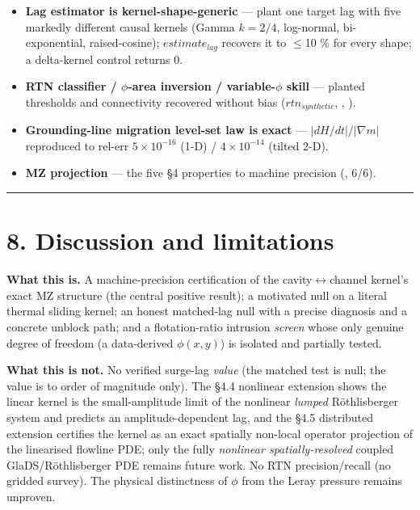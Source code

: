 \documentclass[11pt]{article}
\begin{document}
\begin{itemize}
\item \textbf{Lag estimator is kernel-shape-generic} — plant one target lag with five markedly different causal kernels (Gamma $k=2/4$, log-normal, bi-exponential, raised-cosine); $estimate_{lag}$ recovers it to \ensuremath{\le}10 \% for every shape; a delta-kernel control returns 0.
\item \textbf{RTN classifier / $\phi $-area inversion / variable-$\phi $ skill} — planted thresholds and connectivity recovered without bias ($rtn_{synthetic}$, , ).
\item \textbf{Grounding-line migration level-set law is exact} — $|dH/dt|/|\nabla m|$ reproduced to rel-err $5\times 10^{-16}$ (1-D) / $4\times 10^{-14}$ (tilted 2-D).
\item \textbf{MZ projection} — the five §4 properties to machine precision (, 6/6).
\end{itemize}


\medskip\hrule\medskip


\section*{8. Discussion and limitations}


\textbf{What this is.} A machine-precision certification of the cavity\ensuremath{\leftrightarrow}channel kernel's exact MZ structure (the central positive result); a motivated null on a literal thermal sliding kernel; an honest matched-lag null with a precise diagnosis and a concrete unblock path; and a flotation-ratio intrusion \emph{screen} whose only genuine degree of freedom (a data-derived $\phi (x,y)$) is isolated and partially tested.


\textbf{What this is not.} No verified surge-lag \emph{value} (the matched test is null; the value is to order of magnitude only). The §4.4 nonlinear extension shows the linear kernel is the small-amplitude limit of the nonlinear \emph{lumped} Röthlisberger system and predicts an amplitude-dependent lag, and the §4.5 distributed extension certifies the kernel as an exact spatially non-local operator projection of the linearised flowline PDE; only the fully \emph{nonlinear spatially-resolved} coupled GlaDS/Röthlisberger PDE remains future work. No RTN precision/recall (no gridded survey). The physical distinctness of $\phi $ from the Leray pressure remains unproven.
\end{document}
